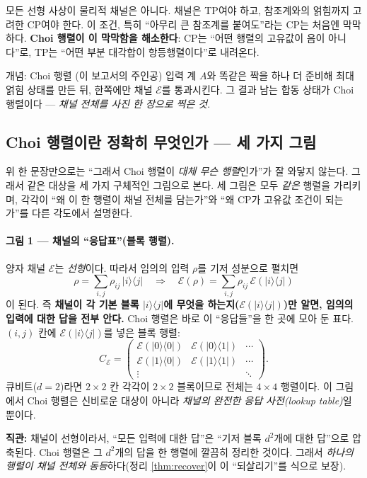 \documentclass[11pt,a4paper]{article}
\newcommand{\E}{\mathcal{E}}
\theoremstyle{definition}
\theoremstyle{plain}
\theoremstyle{remark}
\begin{document}
모든 선형 사상이 물리적 채널은 아니다. 채널은 TP여야 하고, 참조계와의 얽힘까지 고려한 CP여야 한다. 이 조건, 특히 ``아무리 큰 참조계를 붙여도''라는 CP는 처음엔 막막하다. \textbf{Choi 행렬이 이 막막함을 해소한다}: CP는 ``어떤 행렬의 고유값이 음이 아니다''로, TP는 ``어떤 부분 대각합이 항등행렬이다''로 내려온다.

\begin{conceptbox}{개념: Choi 행렬 (이 보고서의 주인공)}
입력 계 $A$와 똑같은 짝을 하나 더 준비해 최대 얽힘 상태를 만든 뒤, 한쪽에만 채널 $\E$를 통과시킨다. 그 결과 남는 합동 상태가 Choi 행렬이다 --- \emph{채널 전체를 사진 한 장으로 찍은 것}.
\end{conceptbox}

\subsection{Choi 행렬이란 정확히 무엇인가 --- 세 가지 그림}

위 한 문장만으로는 ``그래서 Choi 행렬이 \emph{대체 무슨 행렬}인가''가 잘 와닿지 않는다. 그래서 같은 대상을 세 가지 구체적인 그림으로 본다. 세 그림은 모두 \emph{같은} 행렬을 가리키며, 각각이 ``왜 이 한 행렬이 채널 전체를 담는가''와 ``왜 CP가 고유값 조건이 되는가''를 다른 각도에서 설명한다.

\paragraph{그림 1 --- 채널의 ``응답표''(블록 행렬).}
양자 채널 $\E$는 \emph{선형}이다. 따라서 임의의 입력 $\rho$를 기저 성분으로 펼치면
\[
\rho=\sum_{i,j}\rho_{ij}\,|i\rangle\langle j|
\quad\Longrightarrow\quad
\E(\rho)=\sum_{i,j}\rho_{ij}\,\E(|i\rangle\langle j|)
\]
이 된다. 즉 \textbf{채널이 각 기본 블록 $|i\rangle\langle j|$에 무엇을 하는지($\E(|i\rangle\langle j|)$)만 알면, 임의의 입력에 대한 답을 전부 안다.} Choi 행렬은 바로 이 ``응답들''을 한 곳에 모아 둔 표다. $(i,j)$ 칸에 $\E(|i\rangle\langle j|)$를 넣은 블록 행렬:
\[
C_\E=
\begin{pmatrix}
\E(|0\rangle\langle 0|) & \E(|0\rangle\langle 1|) & \cdots\\
\E(|1\rangle\langle 0|) & \E(|1\rangle\langle 1|) & \cdots\\
\vdots & & \ddots
\end{pmatrix}.
\]
큐비트($d=2$)라면 $2\times2$ 칸 각각이 $2\times2$ 블록이므로 전체는 $4\times4$ 행렬이다. 이 그림에서 Choi 행렬은 신비로운 대상이 아니라 \emph{채널의 완전한 응답 사전(lookup table)}일 뿐이다.

\begin{intuitionbox}
\textbf{직관:} 채널이 선형이라서, ``모든 입력에 대한 답''은 ``기저 블록 $d^2$개에 대한 답''으로 압축된다. Choi 행렬은 그 $d^2$개의 답을 한 행렬에 깔끔히 정리한 것이다. 그래서 \emph{하나의 행렬이 채널 전체와 동등}하다(정리 \ref{thm:recover}이 이 ``되살리기''를 식으로 보장).
\end{intuitionbox}
\end{document}
